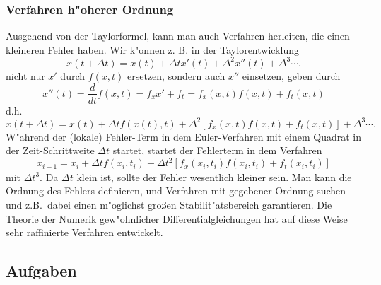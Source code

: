 \subsubsection{Verfahren h"oherer Ordnung }
Ausgehend von der Taylorformel, kann man auch Verfahren herleiten, die einen 
kleineren Fehler haben. Wir k"onnen z. B. in der Taylorentwicklung
$$ x(t+\Delta t) = x(t) + \Delta t x'(t) + \Delta^2 x''(t)+ \Delta^3\cdots.$$
nicht nur $x'$ durch $f(x,t)$ ersetzen, sondern auch $x''$ einsetzen, geben durch
$$ x''(t) = \frac d {dt} f(x,t) = f_x x'+f_t = f_x(x,t) f(x,t)+f_t(x,t)$$
d.h.
$$ x(t+\Delta t) = x(t) + \Delta t f(x(t),t) + \Delta^2 [f_x(x,t) f(x,t)+f_t(x,t)]+ \Delta^3\cdots.$$
W"ahrend der (lokale) Fehler-Term in dem Euler-Verfahren mit einem Quadrat in der 
Zeit-Schrittweite $\Delta t$
startet, startet der Fehlerterm in dem Verfahren
$$ x_{i+1} = x_i + \Delta t f(x_i,t_i) + \Delta t^2 [f_x(x_i,t_i) f(x_i,t_i)+f_t(x_i,t_i)]$$
mit $\Delta t^3$. Da $\Delta t$ klein ist, sollte der Fehler wesentlich kleiner 
sein. Man kann die Ordnung des Fehlers
definieren, und Verfahren mit gegebener Ordnung suchen und z.B.\ dabei einen
m"oglichst gro\ss{}en Stabilit"atsbereich garantieren. Die Theorie der Numerik 
gew"ohnlicher Differentialgleichungen hat auf diese Weise sehr raffinierte 
Verfahren entwickelt.
\par\medskip
{}
\subsection*{Aufgaben}
\begin{auf}\chc\label{block5A2}

\end{auf}
\begin{auf}\chc\label{block5A3}

\end{auf}
\begin{auf}\chc\label{block5A4}

\end{auf}
\begin{auf}\chb\label{block5A5}

\end{auf}
\begin{auf}\cha\label{block5A6}

\end{auf}





